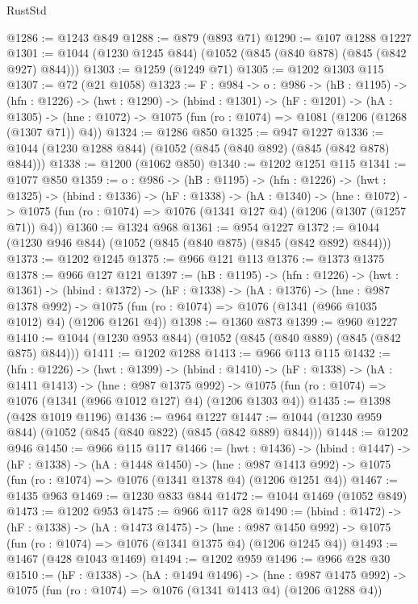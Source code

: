 \begin{lexlean}{RustStd}
\begin{coremodule}
@1286 := @1243 @849
@1288 := @879 (@893 @71)
@1290 := @107 @1288 @1227
@1301 := @1044 (@1230 @1245 @844) (@1052 (@845 (@840 @878) (@845 (@842 @927) @844)))
@1303 := @1259 (@1249 @71)
@1305 := @1202 @1303 @115
@1307 := @72 (@21 @1058)
@1323 := {F : @984} ->
  {o : @986} ->
  (hB : @1195) ->
  (hfn : @1226) ->
  (hwt : @1290) ->
  (hbind : @1301) ->
  (hF : @1201) ->
  (hA : @1305) -> (hne : @1072) -> @1075 (fun (ro : @1074) => @1081 (@1206 (@1268 (@1307 @71)) @4))
@1324 := @1286 @850
@1325 := @947 @1227
@1336 := @1044 (@1230 @1288 @844) (@1052 (@845 (@840 @892) (@845 (@842 @878) @844)))
@1338 := @1200 (@1062 @850)
@1340 := @1202 @1251 @115
@1341 := @1077 @850
@1359 := {o : @986} ->
  (hB : @1195) ->
  (hfn : @1226) ->
  (hwt : @1325) ->
  (hbind : @1336) ->
  (hF : @1338) ->
  (hA : @1340) ->
  (hne : @1072) -> @1075 (fun (ro : @1074) => @1076 (@1341 @127 @4) (@1206 (@1307 (@1257 @71)) @4))
@1360 := @1324 @968
@1361 := @954 @1227
@1372 := @1044 (@1230 @946 @844) (@1052 (@845 (@840 @875) (@845 (@842 @892) @844)))
@1373 := @1202 @1245
@1375 := @966 @121 @113
@1376 := @1373 @1375
@1378 := @966 @127 @121
@1397 := (hB : @1195) ->
  (hfn : @1226) ->
  (hwt : @1361) ->
  (hbind : @1372) ->
  (hF : @1338) ->
  (hA : @1376) ->
  (hne : @987 @1378 @992) ->
  @1075 (fun (ro : @1074) => @1076 (@1341 (@966 @1035 @1012) @4) (@1206 @1261 @4))
@1398 := @1360 @873
@1399 := @960 @1227
@1410 := @1044 (@1230 @953 @844) (@1052 (@845 (@840 @889) (@845 (@842 @875) @844)))
@1411 := @1202 @1288
@1413 := @966 @113 @115
@1432 := (hfn : @1226) ->
  (hwt : @1399) ->
  (hbind : @1410) ->
  (hF : @1338) ->
  (hA : @1411 @1413) ->
  (hne : @987 @1375 @992) ->
  @1075 (fun (ro : @1074) => @1076 (@1341 (@966 @1012 @127) @4) (@1206 @1303 @4))
@1435 := @1398 (@428 @1019 @1196)
@1436 := @964 @1227
@1447 := @1044 (@1230 @959 @844) (@1052 (@845 (@840 @822) (@845 (@842 @889) @844)))
@1448 := @1202 @946
@1450 := @966 @115 @117
@1466 := (hwt : @1436) ->
  (hbind : @1447) ->
  (hF : @1338) ->
  (hA : @1448 @1450) ->
  (hne : @987 @1413 @992) -> @1075 (fun (ro : @1074) => @1076 (@1341 @1378 @4) (@1206 @1251 @4))
@1467 := @1435 @963
@1469 := @1230 @833 @844
@1472 := @1044 @1469 (@1052 @849)
@1473 := @1202 @953
@1475 := @966 @117 @28
@1490 := (hbind : @1472) ->
  (hF : @1338) ->
  (hA : @1473 @1475) ->
  (hne : @987 @1450 @992) -> @1075 (fun (ro : @1074) => @1076 (@1341 @1375 @4) (@1206 @1245 @4))
@1493 := @1467 (@428 @1043 @1469)
@1494 := @1202 @959
@1496 := @966 @28 @30
@1510 := (hF : @1338) ->
  (hA : @1494 @1496) ->
  (hne : @987 @1475 @992) -> @1075 (fun (ro : @1074) => @1076 (@1341 @1413 @4) (@1206 @1288 @4))

\end{coremodule}
\end{lexlean}
